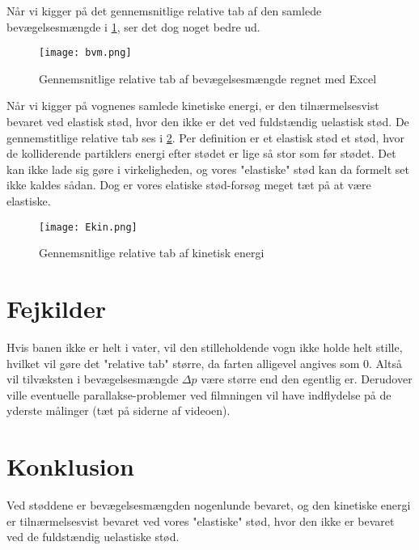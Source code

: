 \documentclass{report}
\begin{document}
Når vi kigger på det gennemsnitlige relative tab af den samlede bevægelsesmængde i \cref{fig:bvm}, ser det dog noget bedre ud.
\begin{figure}[H]
\begin{center}
  \texttt{[image: bvm.png]}
\end{center}
\caption{Gennemsnitlige relative tab af bevægelsesmængde regnet med Excel}
\label{fig:bvm}
\end{figure}
Når vi kigger på vognenes samlede kinetiske energi, er den tilnærmelsesvist bevaret ved elastisk stød, hvor den ikke er det ved fuldstændig uelastisk stød.
De gennemstitlige relative tab ses i \cref{fig:kin}.
Per definition er et elastisk stød et stød, hvor de kolliderende partiklers energi efter stødet er lige så stor som før stødet.
Det kan ikke lade sig gøre i virkeligheden, og vores "elastiske" stød kan da formelt set ikke kaldes sådan.
Dog er vores elatiske stød-forsøg meget tæt på at være elastiske.
\begin{figure}[H]
\begin{center}
  \texttt{[image: Ekin.png]}
\end{center}
\caption{Gennemsnitlige relative tab af kinetisk energi}
\label{fig:kin}
\end{figure}



\section*{Fejkilder}
Hvis banen ikke er helt i vater, vil den stilleholdende vogn ikke holde helt stille, hvilket vil gøre det "relative tab" større, da farten alligevel angives som 0.
Altså vil tilvæksten i bevægelsesmængde $\Delta p$ være større end den egentlig er. 
Derudover ville eventuelle parallakse-problemer ved filmningen vil have indflydelse på de yderste målinger (tæt på siderne af videoen).

\section*{Konklusion}
Ved støddene er bevægelsesmængden nogenlunde bevaret, og den kinetiske energi er tilnærmelsesvist bevaret ved vores "elastiske" stød, hvor den ikke er bevaret ved de fuldstændig uelastiske stød.
\end{document}
